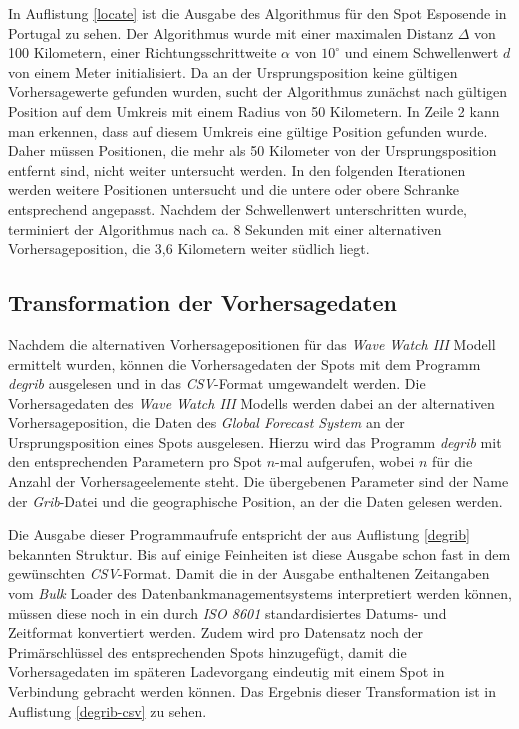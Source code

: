 

In Auflistung \ref{locate} ist die Ausgabe des Algorithmus für den
Spot Esposende in Portugal zu sehen. Der Algorithmus wurde mit einer
maximalen Distanz $\Delta$ von 100 Kilometern, einer
Richtungsschrittweite $\alpha$ von $10^{\circ}$ und einem
Schwellenwert $d$ von einem Meter initialisiert. Da an der
Ursprungsposition keine gültigen Vorhersagewerte gefunden wurden,
sucht der Algorithmus zunächst nach gültigen Position auf dem Umkreis
mit einem Radius von 50 Kilometern. In Zeile 2 kann man erkennen, dass
auf diesem Umkreis eine gültige Position gefunden wurde. Daher müssen
Positionen, die mehr als 50 Kilometer von der Ursprungsposition
entfernt sind, nicht weiter untersucht werden. In den folgenden
Iterationen werden weitere Positionen untersucht und die untere oder
obere Schranke entsprechend angepasst. Nachdem der Schwellenwert
unterschritten wurde, terminiert der Algorithmus nach ca. 8 Sekunden
mit einer alternativen Vorhersageposition, die 3,6 Kilometern weiter
südlich liegt.

\subsection{Transformation der Vorhersagedaten}
Nachdem die alternativen Vorhersagepositionen für das \textit{Wave
  Watch III} Modell ermittelt wurden, können die Vorhersagedaten der
Spots mit dem Programm \textit{degrib} ausgelesen und in das
\textit{CSV}-Format umgewandelt werden. Die Vorhersagedaten des
\textit{Wave Watch III} Modells werden dabei an der alternativen
Vorhersageposition, die Daten des \textit{Global Forecast System} an
der Ursprungsposition eines Spots ausgelesen. Hierzu wird das Programm
\textit{degrib} mit den entsprechenden Parametern pro Spot $n$-mal
aufgerufen, wobei $n$ für die Anzahl der Vorhersageelemente steht. Die
übergebenen Parameter sind der Name der \textit{Grib}-Datei und die
geographische Position, an der die Daten gelesen werden.

Die Ausgabe dieser Programmaufrufe entspricht der aus Auflistung
\ref{degrib} bekannten Struktur. Bis auf einige Feinheiten ist diese
Ausgabe schon fast in dem gewünschten \textit{CSV}-Format. Damit die
in der Ausgabe enthaltenen Zeitangaben vom \textit{Bulk} Loader des
Datenbankmanagementsystems interpretiert werden können, müssen diese
noch in ein durch \textit{ISO 8601} standardisiertes Datums- und
Zeitformat konvertiert werden. Zudem wird pro Datensatz noch der
Primärschlüssel des entsprechenden Spots hinzugefügt, damit die
Vorhersagedaten im späteren Ladevorgang eindeutig mit einem Spot in
Verbindung gebracht werden können. Das Ergebnis dieser Transformation
ist in Auflistung \ref{degrib-csv} zu sehen.

